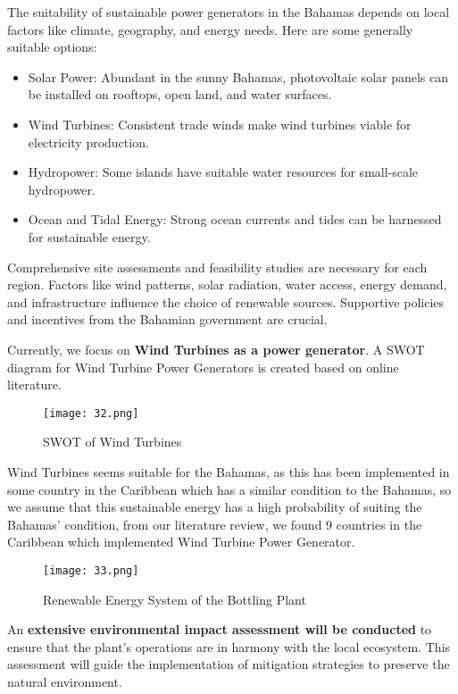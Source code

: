 \documentclass{article}
\begin{document}
\begin{itemize}
The suitability of sustainable power generators in the Bahamas depends on local factors like climate, geography, and energy needs. Here are some generally suitable options:

\begin{itemize}
    \item Solar Power: Abundant in the sunny Bahamas, photovoltaic solar panels can be installed on rooftops, open land, and water surfaces.
    \item Wind Turbines: Consistent trade winds make wind turbines viable for electricity production.
    \item Hydropower: Some islands have suitable water resources for small-scale hydropower.
    \item Ocean and Tidal Energy: Strong ocean currents and tides can be harnessed for sustainable energy.
\end{itemize}

Comprehensive site assessments and feasibility studies are necessary for each region. Factors like wind patterns, solar radiation, water access, energy demand, and infrastructure influence the choice of renewable sources. Supportive policies and incentives from the Bahamian government are crucial.

Currently, we focus on \textbf{Wind Turbines as a power generator}. A SWOT diagram for Wind Turbine Power Generators is created based on online literature.
\begin{figure}[H]
\centering
\texttt{[image: 32.png]}
\caption{SWOT of Wind Turbines}
\label{fig:image1}
\end{figure}

Wind Turbines seems suitable for the Bahamas, as this has been implemented in some country in the Caribbean which has a similar condition to the Bahamas, so we assume that this sustainable energy has a high probability of suiting the Bahamas' condition, from our literature review, we found 9 countries in the Caribbean which implemented Wind Turbine Power Generator.
\begin{figure}[H]
\centering
\texttt{[image: 33.png]}
\caption{Renewable Energy System of the Bottling Plant}
\label{fig:renewable_energy}
\end{figure}
An \textbf{extensive environmental impact assessment will be conducted} to ensure that the plant's operations are in harmony with the local ecosystem. This assessment will guide the implementation of mitigation strategies to preserve the natural environment.


\end{itemize}
\end{document}
